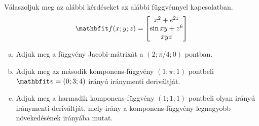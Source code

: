 \begin{exercise}{%
    Válaszoljuk meg az alábbi kérdéseket az alábbi függvénnyel kapcsolatban.
  }
  \[
    \rvec f(x;y;z) = \begin{bmatrix}
      x^2 + e^{2z}  \\
      \sin xy + z^6 \\
      xyz
    \end{bmatrix}
  \]
  \begin{enumerate}[a)]
    \item Adjuk meg a függvény Jacobi-mátrixát a $(2; \pi/4; 0)$ pontban.
    \item Adjuk meg az második komponens-függvény $(1; \pi; 1)$ pontbeli
          $\rvec v = (0; 3; 4)$ irányú iránymenti deriváltját.
    \item Adjuk meg a harmadik komponens-függvény $(1;1;1)$ pontbeli
          olyan irányú iránymenti deriváltját, mely irány a komponens-függvény
          legnagyobb növekedésének irányába mutat.
  \end{enumerate}

\end{exercise}

